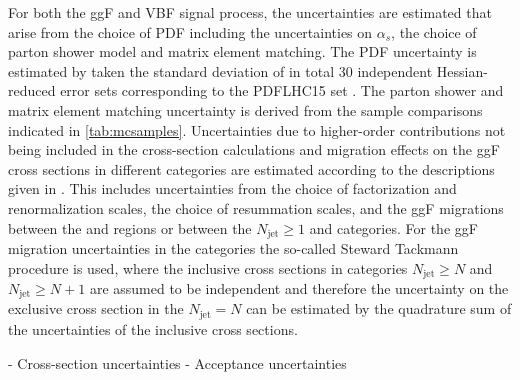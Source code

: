 For both the ggF and VBF signal process, the uncertainties are estimated that arise from the choice of PDF including the uncertainties on $\alpha_s$, the choice of parton shower model and matrix element matching.
The PDF uncertainty is estimated by taken the standard deviation of in total 30 independent Hessian-reduced error sets corresponding to the PDFLHC15 set \cite{Butterworth:2015oua}. 
The parton shower and matrix element matching uncertainty is derived from the sample comparisons indicated in \cref{tab:mcsamples}.
Uncertainties due to higher-order contributions not being included in the cross-section calculations and migration effects on the ggF cross sections in different \Njets categories are estimated according to the descriptions given in .
This includes uncertainties from the choice of factorization and renormalization scales, the choice of resummation scales, and the ggF migrations between the \ZeroJet and \OneJet regions or between the $N_{\text{jet}} \ge 1$  and \TwoJet categories.
For the ggF migration uncertainties in the \TwoJet categories the so-called Steward Tackmann procedure is used, where the inclusive cross sections in categories $N_{\text{jet}} \ge N$ and $N_{\text{jet}} \ge N+1$ are assumed to be independent and therefore the uncertainty on the exclusive cross section in the $N_{\text{jet}} = N$ can be estimated by the quadrature sum of the uncertainties of the inclusive cross sections.




- Cross-section uncertainties
- Acceptance uncertainties


